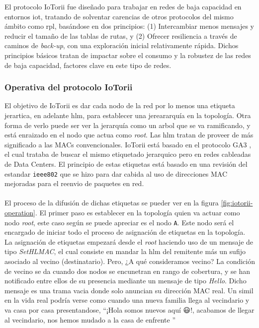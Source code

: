 El protocolo IoTorii fue diseñado para trabajar en redes de baja capacidad en entornos \gls{iot}, tratando de solventar carencias de otros protocolos del mismo ámbito como \gls{rpl}, basándose en dos principios: (1) Intercambiar menos mensajes y reducir el tamaño de las tablas de rutas, y (2) Ofrecer resiliencia a través de caminos de \textit{back-up}, con una exploración inicial relativamente rápida. Dichos principios básicos tratan de impactar sobre el consumo y la robustez de las redes de baja capacidad, factores clave en este tipo de redes.


\subsubsection{Operativa del protocolo IoTorii}

El objetivo de IoTorii es dar cada nodo de la red por lo menos una etiqueta jerartica, en adelante \gls{hlm}, para establecer una jereararquía en la topología. Otra forma de verlo puede ser ver la jerarquía como un arbol que se va ramificando, y está enraizado en el nodo que actua como \textit{root}. Las \gls{hlm} tratan de proveer de más significado a las MACs convencionales. IoTorii está basado en el protocolo GA3 \cite{rojas2017ga3}, el cual trataba de buscar el mismo etiquetado jerarquico pero en redes cableadas de Data Centers. El principio de estas etiquetas está basado en una revisión del estandar \texttt{ieee802} que se hizo para dar cabida al uso de direcciones MAC mejoradas para el reenvio de paquetes en red.\\
\\
El proceso de la difusión de dichas etiquetas se pueder ver en la figura \ref{fig:iotorii-operation}. El primer paso es establecer en la topología quien va actuar como nodo \textit{root}, este caso según se puede apreciar es el nodo \texttt{A}. Este nodo será  el encargado de iniciar todo el proceso de asignación de etiquetas en la topología. La asignación de etiquetas empezará desde el \textit{root} haciendo uso de un mensaje de tipo \textit{SetHLMAC}, el cual consiste en mandar la \gls{hlm} del remitente más un sufijo asociado al vecino (destinatario). Pero, ¿A qué consideramos vecino? La condición de vecino se da cuando dos nodos se encunetran en rango de cobertura, y se han notificado entre ellos de su presencia mediante un mensaje de tipo \textit{Hello}. Dicho mensaje es una trama vacia donde solo anuncian su dirección MAC real. Un simil en la vida real podría verse como cuando una nueva familia llega al vecindario y va casa por casa presentandose, ``¡Hola somos nuevos aquí {\DejaSans 😃}!, acabamos de llegar al vecindario, nos hemos mudado a la casa de enfrente ''\\
\\


